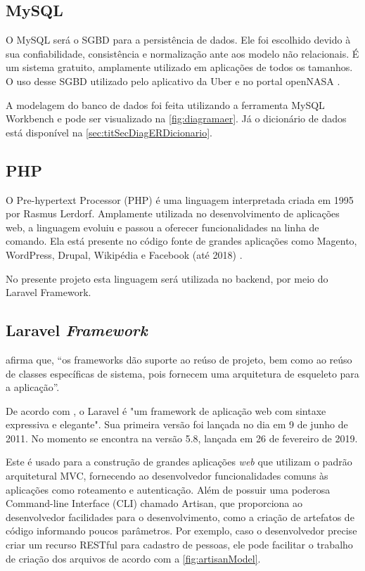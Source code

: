 \subsection{MySQL}
\label{sub:rdb}

O MySQL será o SGBD para a persistência de dados. Ele foi escolhido devido à sua confiabilidade, consistência e normalização ante aos modelo não relacionais. É um sistema gratuito, amplamente utilizado em aplicações de todos os tamanhos. O uso desse SGBD utilizado pelo aplicativo da Uber \cite{klitzkeevan2016} e no portal openNASA \cite{howardalex2011}.

A modelagem do banco de dados foi feita utilizando a ferramenta MySQL Workbench e pode ser visualizado na \autoref{fig:diagramaer}. Já o dicionário de dados está disponível na \autoref{sec:titSecDiagERDicionario}.

\subsection{PHP}
\label{sub:php}

O Pre-hypertext Processor (PHP) é uma linguagem interpretada criada em 1995 por Rasmus Lerdorf. Amplamente utilizada no desenvolvimento de aplicações web, a linguagem evoluiu e passou a oferecer funcionalidades na linha de comando. Ela está presente no código fonte de grandes aplicações como Magento, WordPress, Drupal, Wikipédia e Facebook (até 2018) \cite{emmottfred2019}.

No presente projeto esta linguagem será utilizada no backend, por meio do Laravel Framework.

\subsection{Laravel \textit{Framework}}
\label{sub:laravel}

 afirma que, “os frameworks dão suporte ao reúso de projeto, bem como ao reúso de classes específicas de sistema, pois fornecem uma arquitetura de esqueleto para a aplicação”.

De acordo com , o Laravel é "um framework de aplicação web com sintaxe expressiva e elegante". Sua primeira versão foi lançada no dia em 9 de junho de 2011. No momento se encontra na versão 5.8, lançada em 26 de fevereiro de 2019.

Este é usado para a construção de grandes aplicações \textit{web} que utilizam o padrão arquitetural MVC, fornecendo ao desenvolvedor funcionalidades comuns às aplicações como roteamento e autenticação. Além de possuir uma poderosa Command-line Interface (CLI) chamado Artisan, que proporciona ao desenvolvedor facilidades para o desenvolvimento, como a criação de artefatos de código informando poucos parâmetros. Por exemplo, caso o desenvolvedor precise criar um recurso RESTful para cadastro de pessoas, ele pode facilitar o trabalho de criação dos arquivos de acordo com a \autoref{fig:artisanModel}.

